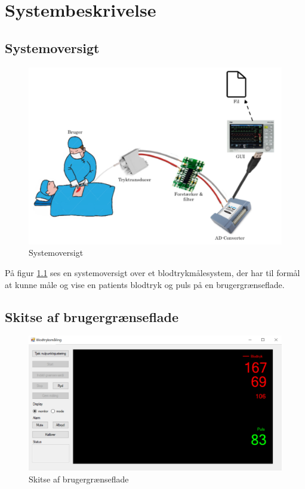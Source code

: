 \chapter{Systembeskrivelse}


\clearpage
\section{Systemoversigt}

	\begin{figure}[h!]
	\centering
	\includegraphics[width=0.55\linewidth]{Systembeskrivelse/Systemoversigt}
	\caption{Systemoversigt}
	\label{fig:Systemoversigt}
\end{figure}
\vspace{1 cm}

På figur \ref{fig:Systemoversigt} ses en systemoversigt over et blodtrykmålesystem, der har til formål at kunne måle og vise en patients blodtryk og puls på en brugergrænseflade. 

\vspace{1.5 cm}
\section{Skitse af brugergrænseflade}
\vspace{0.7 cm}
\begin{figure}[h!]
	\centering
	\includegraphics[width=0.7\linewidth]{Systembeskrivelse/Brugergraenseflade}
	\caption{Skitse af brugergrænseflade}
	\label{fig:Brugergraenseflade}
\end{figure}

\clearpage